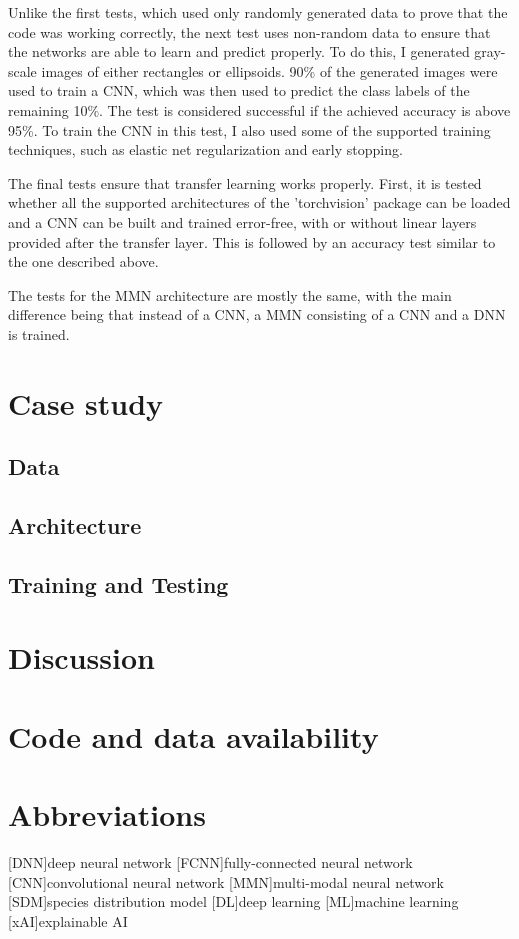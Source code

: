 \documentclass{article}
\begin{document}
Unlike the first tests, which used only randomly generated data to prove that the code was working correctly, the next test uses non-random data to ensure that the networks are able to learn and predict properly. To do this, I generated gray-scale images of either rectangles or ellipsoids. 90\% of the generated images were used to train a CNN, which was then used to predict the class labels of the remaining 10\%. The test is considered successful if the achieved accuracy is above 95\%. To train the CNN in this test, I also used some of the supported training techniques, such as elastic net regularization and early stopping.

The final tests ensure that transfer learning works properly. First, it is tested whether all the supported architectures of the 'torchvision' package can be loaded and a CNN can be built and trained error-free, with or without linear layers provided after the transfer layer. This is followed by an accuracy test similar to the one described above.

The tests for the MMN architecture are mostly the same, with the main difference being that instead of a CNN, a MMN consisting of a CNN and a DNN is trained.





\section{Case study}
\subsection{Data}
\subsection{Architecture}
\subsection{Training and Testing}


\section{Discussion}
\section{Code and data availability}
\section{Abbreviations}
\begin{acronym}
	[DNN]{deep neural network}
	[FCNN]{fully-connected neural network}
	[CNN]{convolutional neural network}
	[MMN]{multi-modal neural network}
	[SDM]{species distribution model}
	[DL]{deep learning}
	[ML]{machine learning}
	[xAI]{explainable AI}
\end{acronym}
\end{document}
